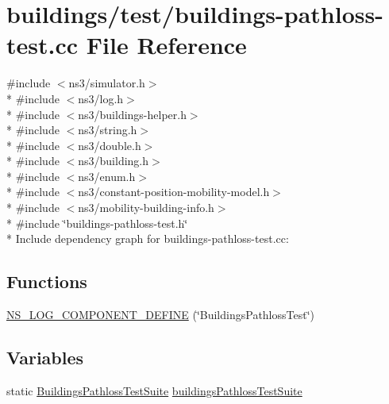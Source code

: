 \hypertarget{buildings-pathloss-test_8cc}{}\section{buildings/test/buildings-\/pathloss-\/test.cc File Reference}
\label{buildings-pathloss-test_8cc}
{\ttfamily \#include $<$ns3/simulator.\+h$>$}\\*
{\ttfamily \#include $<$ns3/log.\+h$>$}\\*
{\ttfamily \#include $<$ns3/buildings-\/helper.\+h$>$}\\*
{\ttfamily \#include $<$ns3/string.\+h$>$}\\*
{\ttfamily \#include $<$ns3/double.\+h$>$}\\*
{\ttfamily \#include $<$ns3/building.\+h$>$}\\*
{\ttfamily \#include $<$ns3/enum.\+h$>$}\\*
{\ttfamily \#include $<$ns3/constant-\/position-\/mobility-\/model.\+h$>$}\\*
{\ttfamily \#include $<$ns3/mobility-\/building-\/info.\+h$>$}\\*
{\ttfamily \#include \char`\"{}buildings-\/pathloss-\/test.\+h\char`\"{}}\\*
Include dependency graph for buildings-\/pathloss-\/test.cc\+:
\subsection*{Functions}
\begin{DoxyCompactItemize}
\item 
\hyperlink{buildings-pathloss-test_8cc_ac90f0c87396b5180b3f4ab2c17e025ba}{N\+S\+\_\+\+L\+O\+G\+\_\+\+C\+O\+M\+P\+O\+N\+E\+N\+T\+\_\+\+D\+E\+F\+I\+NE} (\char`\"{}Buildings\+Pathloss\+Test\char`\"{})
\end{DoxyCompactItemize}
\subsection*{Variables}
\begin{DoxyCompactItemize}
\item 
static \hyperlink{classBuildingsPathlossTestSuite}{Buildings\+Pathloss\+Test\+Suite} \hyperlink{buildings-pathloss-test_8cc_a99e98403aad55a85cc9dfe2656a76b13}{buildings\+Pathloss\+Test\+Suite}
\end{DoxyCompactItemize}


